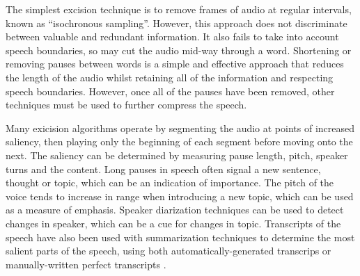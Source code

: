 
%

The simplest excision technique is to remove frames of audio at regular intervals, known as ``isochronous sampling''.
However, this approach does not discriminate between valuable and redundant information. It also fails to take into
account speech boundaries, so may cut the audio mid-way through a word. Shortening or removing pauses between words is
a simple and effective approach that reduces the length of the audio whilst retaining all of the information and
respecting speech boundaries. However, once all of the pauses have been removed, other techniques must be used to
further compress the speech.


Many exicision algorithms operate by segmenting the audio at points of increased saliency, then playing only the
beginning of each segment before moving onto the next. The saliency can be determined by measuring pause length, pitch,
speaker turns and the content.  Long pauses in speech often signal a new sentence, thought or topic, which can be an
indication of importance. The pitch of the voice tends to increase in range when introducing a new topic, which can be
used as a measure of emphasis.  Speaker diarization techniques \citep{AngueraMiro2012} can be used to detect changes in
speaker, which can be a cue for changes in topic. Transcripts of the speech have also been used with summarization
techniques to determine the most salient parts of the speech, using both automatically-generated transcrips
\citep{Hori2003} or manually-written perfect transcripts \citep{Tucker2006}.

